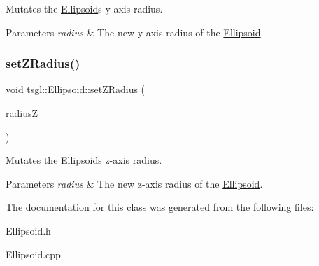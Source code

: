Mutates the \hyperlink{classtsgl_1_1_ellipsoid}{Ellipsoid}\textquotesingle{}s y-\/axis radius. 


\begin{DoxyParams}{Parameters}
{\em radius} & The new y-\/axis radius of the \hyperlink{classtsgl_1_1_ellipsoid}{Ellipsoid}. \\
\hline
\end{DoxyParams}
\mbox{\label{classtsgl_1_1_ellipsoid_a6663042d8935a658b8a27a5843d897e8}} 
\subsubsection{\texorpdfstring{set\+Z\+Radius()}{setZRadius()}}
{\footnotesize\ttfamily void tsgl\+::\+Ellipsoid\+::set\+Z\+Radius (\begin{DoxyParamCaption}\item[{G\+Lfloat}]{radiusZ }\end{DoxyParamCaption})\hspace{0.3cm}{\ttfamily [virtual]}}



Mutates the \hyperlink{classtsgl_1_1_ellipsoid}{Ellipsoid}\textquotesingle{}s z-\/axis radius. 


\begin{DoxyParams}{Parameters}
{\em radius} & The new z-\/axis radius of the \hyperlink{classtsgl_1_1_ellipsoid}{Ellipsoid}. \\
\hline
\end{DoxyParams}


The documentation for this class was generated from the following files\+:\begin{DoxyCompactItemize}
\item 
Ellipsoid.\+h\item 
Ellipsoid.\+cpp\end{DoxyCompactItemize}
